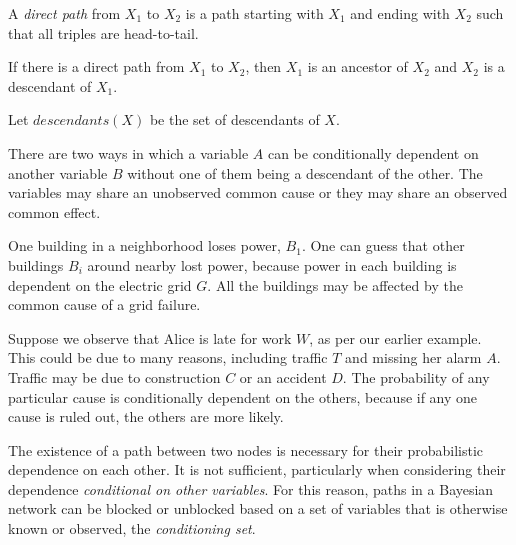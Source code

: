 \documentclass[../thesis.tex]{subfiles}
\begin{document}
\begin{dfn}
  A \emph{direct path} from \(X_1\) to \(X_2\)
  is a path starting with \(X_1\) and ending with \(X_2\)
  such that all triples are head-to-tail.
\end{dfn}

\begin{dfn}
  If there is a direct path from \(X_1\) to \(X_2\),
  then $X_1$ is an ancestor of $X_2$ and $X_2$ is a descendant
  of $X_1$.

  Let $descendants(X)$ be the set of descendants of $X$.
\end{dfn}


There are two ways in which a variable
\(A\) can be conditionally dependent on another variable \(B\) without
one of them being a descendant of the other.
The variables may share an unobserved common cause
or they may share an observed common effect.

\begin{exm}
  One building in a neighborhood loses power, $B_1$.
  One can guess that other buildings $B_i$ around nearby lost power,
  because power in each building is dependent on the electric grid
  $G$. All the buildings may be affected by the common cause of a grid
  failure.
\end{exm}
\begin{center}
\end{center}

\begin{exm}
  Suppose we observe that Alice is late for work $W$, as per our
  earlier example. This could be due to many reasons,
  including traffic $T$ and missing her alarm $A$.
  Traffic may be due to construction $C$ or an accident $D$.
  The probability of any particular cause is conditionally
  dependent on the others, because if any one cause is
  ruled out, the others are more likely.
\end{exm}

The existence of a path between two nodes is
necessary for their probabilistic dependence on each other.
It is not sufficient, particularly when considering
their dependence \emph{conditional on other variables}.
For this reason, paths in a Bayesian network can be
blocked or unblocked based on a set of variables that is
otherwise known or observed, the \emph{conditioning set}.
\end{document}
